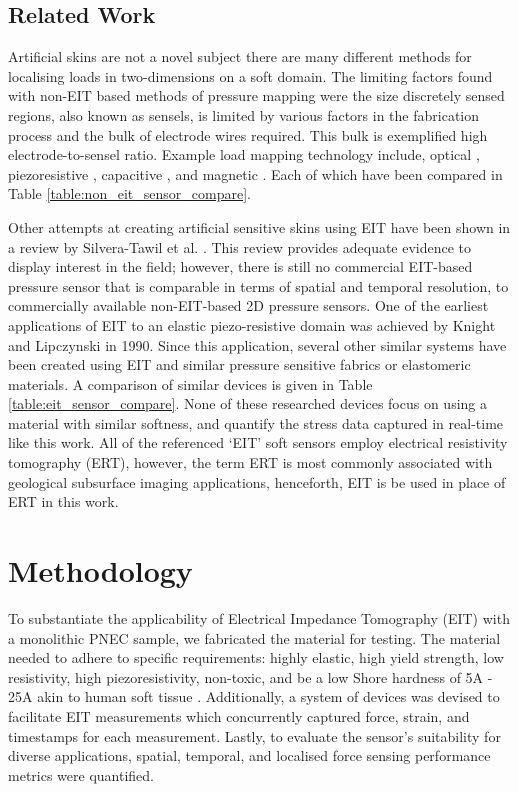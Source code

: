 \subsection{Related Work} \label{sec:Related Work}
Artificial skins are not a novel subject there are many different methods for localising loads in two-dimensions on a soft domain. The limiting factors found with non-EIT based methods of pressure mapping were the size discretely sensed regions, also known as sensels, is limited by various factors in the fabrication process and the bulk of electrode wires required. This bulk is exemplified high electrode-to-sensel ratio. Example load mapping technology include, optical \citep{Ramuz2012,Shimadera2022,Rossiter2005}, piezoresistive \citep{Gilanizadehdizaj2022,Fu2020,Yang2022}, capacitive \citep{Liang2015}, and magnetic \citep{Yan2021}. Each of which have been compared in Table \ref{table:non_eit_sensor_compare}. 


Other attempts at creating artificial sensitive skins using EIT have been shown in a review by Silvera-Tawil et al. \cite{Silvera-Tawil2015}. This review provides adequate evidence to display interest in the field; however, there is still no commercial EIT-based pressure sensor that is comparable in terms of spatial and temporal resolution, to commercially available non-EIT-based 2D pressure sensors.
One of the earliest applications of EIT to an elastic piezo-resistive domain was achieved by Knight and Lipczynski \cite{Knight1990} in 1990. Since this application, several other similar systems have been created using EIT and similar pressure sensitive fabrics or elastomeric materials\cite{Nagakubo2007,Russo2017,Sun2020,Silvera-Tawil2015,Yoon2017,Kato2007,Biasi2022}. A comparison of similar devices is given in Table \ref{table:eit_sensor_compare}. None of these researched devices focus on using a material with similar softness, and quantify the stress data captured in real-time like this work. All of the referenced `EIT' soft sensors employ electrical resistivity tomography (ERT), however, the term ERT is most commonly associated with geological subsurface imaging applications, henceforth, EIT is be used in place of ERT in this work.



\section{Methodology} \label{sec:Methodology}
To substantiate the applicability of Electrical Impedance Tomography (EIT) with a monolithic PNEC sample, we fabricated the material for testing. The material needed to adhere to specific requirements: highly elastic,  high yield strength, low resistivity, high piezoresistivity, non-toxic, and be a low Shore hardness of 5A - 25A akin to human soft tissue \citep{Silvera-Tawil2015,Chatzistergos2022,McDermott2017,Landry2021}. Additionally, a system of devices was devised to facilitate EIT measurements which concurrently captured force, strain, and timestamps for each measurement. Lastly, to evaluate the sensor's suitability for diverse applications, spatial, temporal, and localised force sensing performance metrics were quantified.


